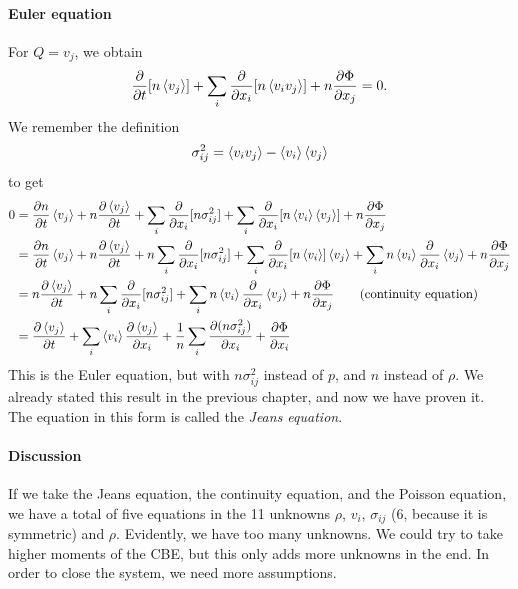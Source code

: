 \paragraph*{Euler equation}
For $Q = v_j$, we obtain
\begin{align}
	\label{eq:euler-collisionless}
	\pdv{}{t}[n \left\langle v_j \right\rangle]
	+ \sum_{i} \pdv{}{x_i} [n \left\langle v_i v_j \right\rangle]
	+ n \pdv{\Phi}{x_j}
	= 0.
\end{align}
We remember the definition
\begin{align*}
	\sigma_{ij}^2 = \left\langle v_i v_j \right\rangle - \left\langle v_i \right\rangle \left\langle v_j \right\rangle
\end{align*}
to get
\begin{align*}
	0
	&= \pdv{n}{t} \left\langle v_j \right\rangle
	+ n \pdv{\left\langle v_j \right\rangle}{t}
	+ \sum_{i} \pdv{}{x_i} [n \sigma_{ij}^2]
	+ \sum_{i} \pdv{}{x_i} [n \left\langle v_i \right\rangle\left\langle v_j \right\rangle]
	+ n \pdv{\Phi}{x_j}\\
	&= \pdv{n}{t} \left\langle v_j \right\rangle
	+ n \pdv{\left\langle v_j \right\rangle}{t}
	+ n \sum_{i} \pdv{}{x_i} [n \sigma_{ij}^2]
	+ \sum_{i} \pdv{}{x_i}[n \left\langle v_i \right\rangle] \left\langle v_j \right\rangle
	+ \sum_{i} n \left\langle v_i \right\rangle \pdv{}{x_i} \left\langle v_j \right\rangle
	+ n \pdv{\Phi}{x_j}\\
	&= n \pdv{\left\langle v_j \right\rangle}{t}
	+ n \sum_{i} \pdv{}{x_i} [n \sigma_{ij}^2]
	+ \sum_{i} n \left\langle v_i \right\rangle \pdv{}{x_i} \left\langle v_j \right\rangle
	+ n \pdv{\Phi}{x_j}
	\qquad \text{(continuity equation)}
	\\
	&= \pdv{\left\langle v_j \right\rangle}{t}
	+ \sum_{i} \left\langle v_i \right\rangle \pdv{\left\langle v_j \right\rangle}{x_i}
	+ \frac{1}{n} \sum_{i} \pdv{(n \sigma_{ij}^2)}{x_i}
	+ \pdv{\Phi}{x_i}
\end{align*}
This is the Euler equation, but with $n \sigma_{ij}^2$ instead of $p$, and $n$ instead of $\rho$. We already stated this result in the previous chapter, and now we have proven it. The equation in this form is called the \emph{Jeans equation}.

\paragraph*{Discussion}
If we take the Jeans equation, the continuity equation, and the Poisson equation, we have a total of five equations in the 11 unknowns $\rho$, $v_i$, $\sigma_{ij}$ (6, because it is symmetric) and $\rho$. Evidently, we have too many unknowns. We could try to take higher moments of the CBE, but this only adds more unknowns in the end. In order to close the system, we need more assumptions.




